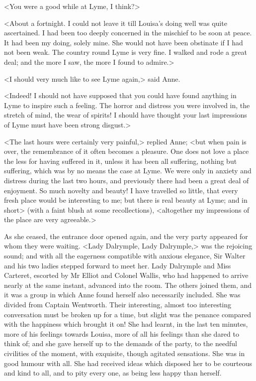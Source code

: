 <You were a good while at Lyme, I think?>

<About a fortnight. I could not leave it till Louisa's doing well was quite ascertained. I had been too deeply concerned in the mischief to be soon at peace. It had been my doing, solely mine. She would not have been obstinate if I had not been weak. The country round Lyme is very fine. I walked and rode a great deal; and the more I saw, the more I found to admire.>

<I should very much like to see Lyme again,> said Anne.

<Indeed! I should not have supposed that you could have found anything in Lyme to inspire such a feeling. The horror and distress you were involved in, the stretch of mind, the wear of spirits! I should have thought your last impressions of Lyme must have been strong disgust.>

<The last hours were certainly very painful,> replied Anne; <but when pain is over, the remembrance of it often becomes a pleasure. One does not love a place the less for having suffered in it, unless it has been all suffering, nothing but suffering, which was by no means the case at Lyme. We were only in anxiety and distress during the last two hours, and previously there had been a great deal of enjoyment. So much novelty and beauty! I have travelled so little, that every fresh place would be interesting to me; but there is real beauty at Lyme; and in short> (with a faint blush at some recollections), <altogether my impressions of the place are very agreeable.>

As she ceased, the entrance door opened again, and the very party appeared for whom they were waiting. <Lady Dalrymple, Lady Dalrymple,> was the rejoicing sound; and with all the eagerness compatible with anxious elegance, Sir Walter and his two ladies stepped forward to meet her. Lady Dalrymple and Miss Carteret, escorted by Mr Elliot and Colonel Wallis, who had happened to arrive nearly at the same instant, advanced into the room. The others joined them, and it was a group in which Anne found herself also necessarily included. She was divided from Captain Wentworth. Their interesting, almost too interesting conversation must be broken up for a time, but slight was the penance compared with the happiness which brought it on! She had learnt, in the last ten minutes, more of his feelings towards Louisa, more of all his feelings than she dared to think of; and she gave herself up to the demands of the party, to the needful civilities of the moment, with exquisite, though agitated sensations. She was in good humour with all. She had received ideas which disposed her to be courteous and kind to all, and to pity every one, as being less happy than herself.

